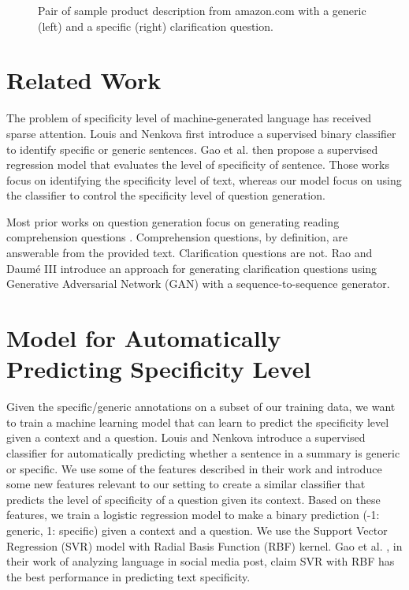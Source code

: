 \documentclass[11pt]{article}
\begin{document}
\begin{figure}[h]
    \caption{Pair of sample product description from amazon.com with a generic (left) and a specific (right) clarification question.}\label{amazon-ex-1}
\end{figure}

\section{Related Work}
The problem of specificity level of machine-generated language has received sparse attention. Louis and Nenkova  \cite{louis2011automatic} first introduce a supervised binary classifier to identify specific or generic sentences. Gao et al. \cite{Gao2019PredictingAA} then propose a supervised regression model that evaluates the level of specificity of sentence. Those works focus on identifying the specificity level of text, whereas our model focus on using the classifier to control the specificity level of question generation.

Most prior works on question generation focus on generating reading comprehension questions \cite{vanderwende2008importance}. Comprehension questions, by definition, are answerable from the provided text. Clarification questions are not. Rao and Daum{\'e} III \cite{rao2019} introduce an approach for generating clarification questions using Generative Adversarial Network (GAN) \cite{goodfellow2014generative} with a sequence-to-sequence generator. 



\section{Model for Automatically Predicting Specificity Level}\label{classifier}

Given the specific/generic annotations on a subset of our training data, we want to train a machine learning model that can learn to predict the specificity level given a context and a question. Louis and Nenkova  \cite{louis2011automatic} introduce a supervised classifier for automatically predicting whether a sentence in a summary is generic or specific. We use some of the features described in their work and introduce some new features relevant to our setting to create a similar classifier that predicts the level of specificity of a question given its context. Based on these features, we train a logistic regression model to make a binary prediction (-1: generic, 1: specific) given a context and a question. We use the Support Vector Regression (SVR) model with Radial Basis Function (RBF) kernel. Gao et al. \cite{Gao2019PredictingAA}, in their work of analyzing language in social media post, claim SVR with RBF has the best performance in predicting text specificity.\\
\end{document}
